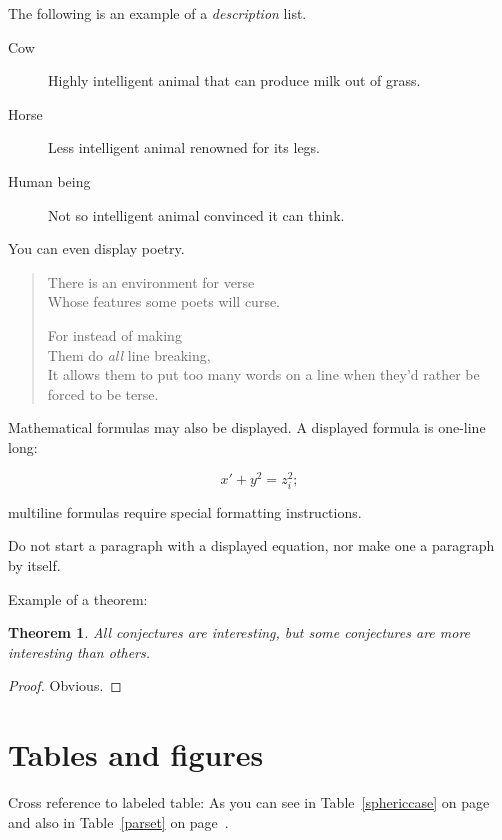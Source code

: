 \documentclass[ba]{imsart}
\numberwithin{equation}{section}
\theoremstyle{plain}
\newtheorem{thm}{Theorem}[section]
\begin{document}
The following is an example of a {\em description} list.
\begin{description}
\item[Cow] Highly intelligent animal that can produce milk out of grass.
\item[Horse] Less intelligent animal renowned for its legs.
\item[Human being] Not so intelligent animal convinced it can think.
\end{description}

You can even display poetry.
\begin{verse}
  There is an environment for verse
  \\ %
  Whose features some poets will curse.  %


  For instead of making\\
  Them do {\em all\/} line breaking, \\
  It allows them to put too many words on a line when they'd rather be
  forced to be terse.
\end{verse}

Mathematical formulas may also be displayed.  A displayed formula is
one-line long:

   \[  x' + y^{2} = z_{i}^{2};\]

   multiline formulas require special formatting instructions.

   Do not start a paragraph with a displayed equation, nor make one a
   paragraph by itself.

Example of a theorem:


\begin{thm}
All conjectures are interesting, but some conjectures are more
interesting than others.
\end{thm}

\begin{proof}
Obvious.
\end{proof}

\section{Tables and figures}
Cross reference to labeled table: As you can see in Table~\ref{sphericcase} on
page~\pageref{sphericcase} and also in Table~\ref{parset} on page~\pageref{parset}.
\end{document}
